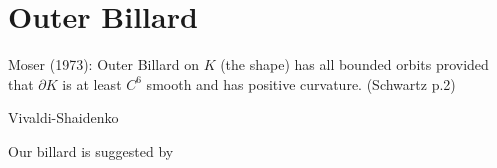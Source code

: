 \documentclass[12pt,twoside,draft]{book}
\begin{document}
\chapter{Outer Billard}

Moser (1973):
Outer Billard on $K$ (the shape) has all bounded orbits provided that $\partial K$ is at least $C^6$ smooth and has positive curvature. (Schwartz p.2)

Vivaldi-Shaidenko

Our billard is suggested by
 



\printindex
\end{document}
